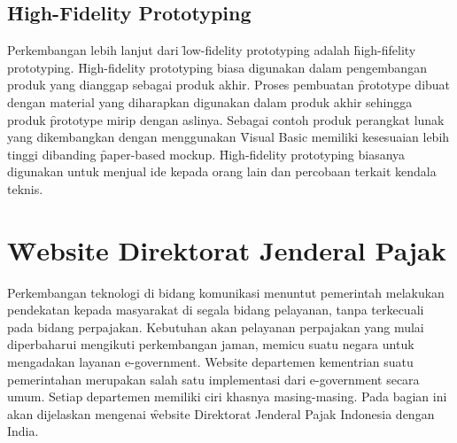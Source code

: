 \subsection{\f{High-Fidelity Prototyping}}
Perkembangan lebih lanjut dari \f{low-fidelity prototyping} adalah \f{high-fifelity prototyping}. \f{High-fidelity prototyping} biasa digunakan dalam pengembangan produk yang dianggap sebagai produk akhir. Proses pembuatan \f{prototype} dibuat dengan material yang diharapkan digunakan dalam produk akhir sehingga produk \f{prototype} mirip dengan aslinya. Sebagai contoh produk perangkat lunak yang dikembangkan dengan menggunakan \f{Visual Basic} memiliki kesesuaian lebih tinggi dibanding \f{paper-based mockup}. \f{High-fidelity prototyping} biasanya digunakan untuk menjual ide kepada orang lain dan percobaan terkait kendala teknis.
\section{\f{Website} Direktorat Jenderal Pajak}
Perkembangan teknologi di bidang komunikasi menuntut pemerintah melakukan pendekatan kepada masyarakat di segala bidang pelayanan, tanpa terkecuali pada bidang perpajakan. Kebutuhan akan pelayanan perpajakan yang mulai diperbaharui mengikuti perkembangan jaman, memicu suatu negara untuk mengadakan layanan e-government. Website departemen kementrian suatu pemerintahan merupakan salah satu implementasi dari e-government secara umum. Setiap departemen memiliki ciri khasnya masing-masing. Pada bagian ini akan dijelaskan mengenai \f{website} Direktorat Jenderal Pajak Indonesia dengan India.
